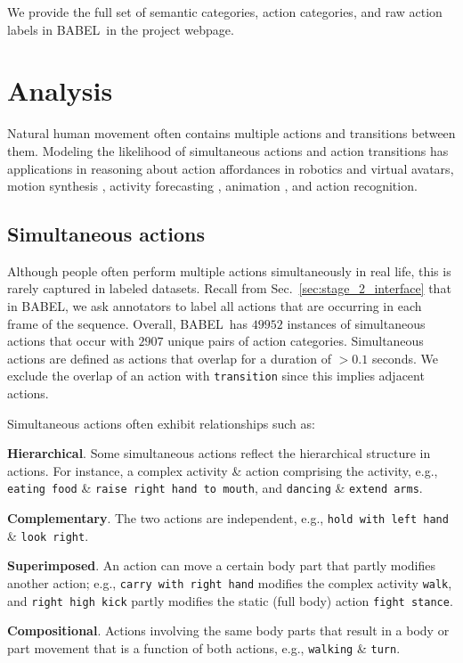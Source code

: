 \documentclass[final]{cvpr}
\def\babel{BABEL}
\begin{document}
We provide the full set of semantic categories, action categories, and raw action labels in \babel~in the project webpage.
 \section{Analysis}

Natural human movement often contains multiple actions and transitions between them. 
Modeling the likelihood of simultaneous actions and action transitions has applications in reasoning about action affordances in robotics and virtual avatars, motion synthesis \cite{DBLP:journals/corr/abs-1912-06079}, activity forecasting \cite{DBLP:conf/eccv/KitaniZBH12}, animation \cite{starke2019neural}, and action recognition.

\noindent
\subsection{Simultaneous actions}
Although people often perform multiple actions simultaneously in real life, this is rarely captured in labeled datasets. 
Recall from Sec.~\ref{sec:stage_2_interface} that in \babel, we ask annotators to label all actions that are occurring in each frame of the sequence. 
Overall, \babel~has $49952$ instances of simultaneous actions that occur with $2907$ unique pairs of action categories. 
Simultaneous actions are defined as actions that overlap for a duration of $> 0.1$ seconds. 
We exclude the overlap of an action with \texttt{transition} since this implies adjacent actions. 

Simultaneous actions often exhibit relationships such as: 
\begin{compactenum}
\item \textbf{Hierarchical}. Some simultaneous actions reflect the hierarchical structure in actions. For instance, a complex activity \& action comprising the activity, e.g., \texttt{eating food} \& \texttt{raise right hand to mouth}, and \texttt{dancing} \& \texttt{extend arms}. 
\item \textbf{Complementary}. The two actions are independent, e.g., \texttt{hold with left hand} \& \texttt{look right}. 
\item \textbf{Superimposed}. An action can move a certain body part that partly modifies another action; e.g., \texttt{carry with right hand} modifies the complex activity \texttt{walk}, and \texttt{right high kick} partly modifies the static (full body) action \texttt{fight stance}. 
\item \textbf{Compositional}. Actions involving the same body parts that result in a body or part movement that is a function of both actions, e.g., \texttt{walking} \& \texttt{turn}. 
\end{compactenum}
\end{document}
